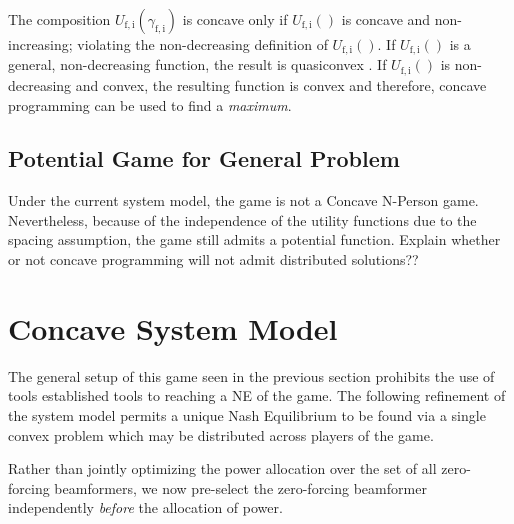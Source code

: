 \documentclass[12pt,a4paper]{report}
\begin{document}
\begin{enumerate}
\begin{itemize}
The composition $U_{\mathrm{f,i}}(\gamma_{\mathrm{f,i}}) $ is concave only if $U_{\mathrm{f,i}}() $ is concave and non-increasing; violating the non-decreasing definition of $U_{\mathrm{f,i}}() $.
If $U_{\mathrm{f,i}}() $ is a general, non-decreasing function, the result is quasiconvex \cite[p.~102]{BoV:04}. If $U_{\mathrm{f,i}}() $ is  non-decreasing and convex, the resulting
   function is convex and therefore, concave programming can be used to find a \emph{maximum}. 
\end{itemize}

\end{enumerate}

\subsection{Potential Game for General Problem}
Under the current system model, the game is not a Concave N-Person game. Nevertheless, because of the independence of the utility functions due to the spacing assumption, the game still admits a potential function.
Explain whether or not concave programming will not admit distributed solutions??


\section{Concave System Model}\label{conmodel}

The general setup of this game seen in the previous section prohibits the use of tools established tools to reaching a NE of the game.
The following refinement of the system model permits a unique Nash Equilibrium to be found via a single convex problem which may be distributed across players of the game.
\par
Rather than jointly optimizing the power allocation over the set of all zero-forcing beamformers, we now pre-select the zero-forcing beamformer independently \emph{before} the allocation of power. 
\end{document}
